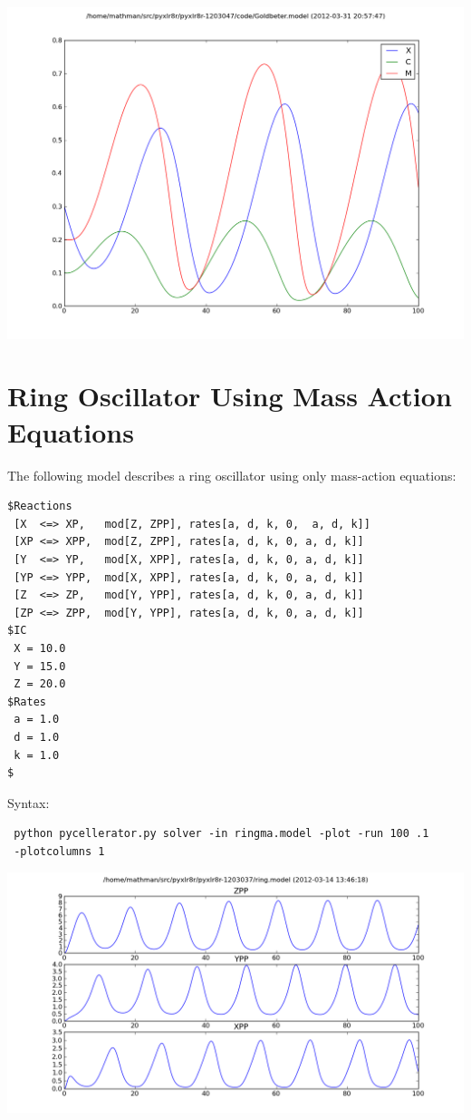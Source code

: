 \begin{center}
\includegraphics[width=.5\textwidth]{Goldbeter.png}
\end{center}


\clearpage
\section[Ring Oscillator (Mass Action)]{Ring Oscillator Using Mass Action Equations}

The following model describes a ring oscillator using only mass-action equations: 
\begin{lstlisting}
$Reactions
 [X  <=> XP,   mod[Z, ZPP], rates[a, d, k, 0,  a, d, k]]
 [XP <=> XPP,  mod[Z, ZPP], rates[a, d, k, 0, a, d, k]]
 [Y  <=> YP,   mod[X, XPP], rates[a, d, k, 0, a, d, k]] 
 [YP <=> YPP,  mod[X, XPP], rates[a, d, k, 0, a, d, k]] 
 [Z  <=> ZP,   mod[Y, YPP], rates[a, d, k, 0, a, d, k]]
 [ZP <=> ZPP,  mod[Y, YPP], rates[a, d, k, 0, a, d, k]]
$IC
 X = 10.0
 Y = 15.0
 Z = 20.0
$Rates
 a = 1.0
 d = 1.0
 k = 1.0
$
\end{lstlisting}

Syntax:

\begin{lstlisting}
 python pycellerator.py solver -in ringma.model -plot -run 100 .1 
 -plotcolumns 1
\end{lstlisting}

\includegraphics[width=\textwidth]{ringma.png}

